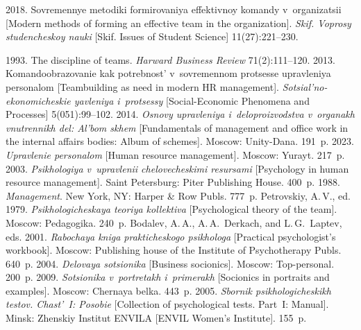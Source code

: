 \begin{multicols}{2}
{{\begin{thebibliography}{99}
    2018. So\-vre\-men\-nye 
me\-to\-di\-ki for\-mi\-ro\-va\-niya ef\-fek\-tiv\-noy ko\-man\-dy v~or\-ga\-ni\-za\-tsii [Modern methods of forming an 
effective team in the organization]. \textit{Skif. Voprosy stu\-den\-che\-skoy na\-u\-ki} [Skif. Issues of 
Student Science] 11(27):221--230.

    1993. The discipline of teams. \textit{Harward 
Business Review} 71(2):111--120.
    2013. Ko\-man\-do\-ob\-ra\-zo\-va\-nie kak po\-treb\-nost' v~so\-vre\-men\-nom 
pro\-tses\-se uprav\-le\-niya per\-so\-na\-lom [Teambuilding as need in modern HR management]. 
\textit{Sotsial'no-ekonomicheskie yavleniya i~protsessy} [Social-Economic Phenomena and 
Processes] 5(051):99--102.
    2014. \textit{Osno\-vy uprav\-le\-niya 
i~de\-lo\-pro\-iz\-vod\-st\-va v~or\-ga\-nakh vnut\-ren\-nikh del: Al'bom skhem} 
[Fundamentals of management and office work in the internal affairs bodies: Album of schemes]. Moscow: Unity-Dana. 191~p.
    2023. \textit{Uprav\-le\-nie 
per\-so\-na\-lom} [Human resource 
management]. Moscow: Yurayt. 217~p.
    2003. \textit{Psi\-kho\-lo\-giya v~uprav\-le\-nii che\-lo\-ve\-che\-ski\-mi re\-sur\-sa\-mi} 
   [Psychology in human resource management]. Saint Petersburg: 
Piter Publishing House. 400~p.
    1988. \textit{Management}. New York, 
NY: Harper \& Row Publs. 777~p.
   Petrovskiy, A.\,V., ed. 1979. \textit{Psi\-kho\-lo\-gi\-che\-skaya teo\-riya kol\-lek\-ti\-va} [Psychological 
theory of the team]. Moscow: Pedagogika. 240~p.
   Bodalev, A.\,A., A.\,A.~Derkach, and L.\,G.~Laptev, eds. 2001. \textit{Ra\-bo\-chaya kni\-ga 
prak\-ti\-che\-sko\-go psi\-kho\-lo\-ga} [Practical 
psychologist's workbook]. Moscow: Publishing house of the 
Institute of Psychotherapy Publs. 640~p.
    2004. \textit{De\-lo\-vaya so\-tsi\-o\-ni\-ka} [Business socionics]. Moscow:  
Top-personal. 200~p.
    2009. \textit{So\-tsi\-o\-ni\-ka v~portre\-takh i~pri\-me\-rakh} [Socionics in portraits 
and examples]. Moscow: Chernaya belka. 443~p.
     2005. \textit{Sbor\-nik psi\-kho\-lo\-gi\-che\-skikh tes\-tov. Chast'~I: Posobie} 
[Collection of psychological tests. Part~I: Manual].  Minsk: Zhenskiy Institut ENVILA
[ENVIL Women's Institute]. 155~p.


\end{thebibliography}}}
\end{multicols}
